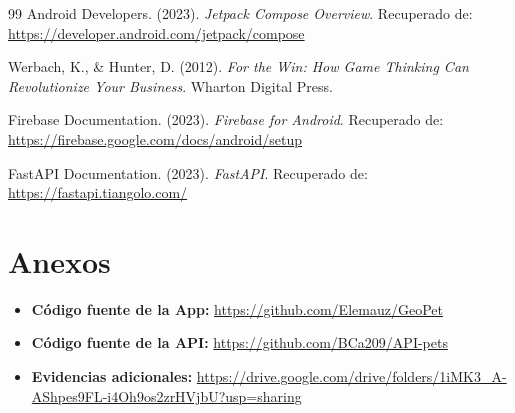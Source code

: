 \documentclass[12pt]{article}
\begin{document}
\begin{thebibliography}{99}
    Android Developers. (2023). \textit{Jetpack Compose Overview}. Recuperado de: \url{https://developer.android.com/jetpack/compose}

    Werbach, K., \& Hunter, D. (2012). \textit{For the Win: How Game Thinking Can Revolutionize Your Business}. Wharton Digital Press.

    Firebase Documentation. (2023). \textit{Firebase for Android}. Recuperado de: \url{https://firebase.google.com/docs/android/setup}

    FastAPI Documentation. (2023). \textit{FastAPI}. Recuperado de: \url{https://fastapi.tiangolo.com/}
\end{thebibliography}


\section{Anexos}

\begin{itemize}
    \item \textbf{Código fuente de la App:} \url{https://github.com/Elemauz/GeoPet}
    \item \textbf{Código fuente de la API:} \url{https://github.com/BCa209/API-pets}
    \item \textbf{Evidencias adicionales:} \url{https://drive.google.com/drive/folders/1iMK3_A-AShpes9FL-i4Oh9os2zrHVjbU?usp=sharing}
\end{itemize}
\end{document}
